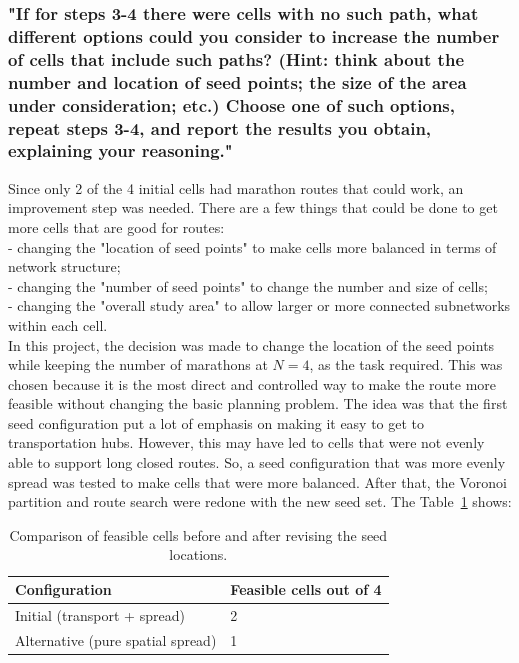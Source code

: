 \documentclass[acmsmall,nonacm,natbib=false]{acmart}
\begin{document}
\subsubsection{\large\textbf{{"If for steps 3-4 there were cells with no such path, what different options could you consider to increase the number of cells that include such paths? (Hint: think about the number and location of seed points; the size of the area under consideration; etc.) Choose one of such options, repeat steps 3-4, and report the results you obtain, explaining your reasoning."}}}
\leavevmode \par \noindent
Since only 2 of the 4 initial cells had marathon routes that could work, an improvement step was needed. There are a few things that could be done to get more cells that are good for routes:\\
- changing the "location of seed points" to make cells more balanced in terms of network structure;\\ - changing the "number of seed points" to change the number and size of cells;\\ - changing the "overall study area" to allow larger or more connected subnetworks within each cell.\\
In this project, the decision was made to change the location of the seed points while keeping the number of marathons at $N=4$, as the task required. This was chosen because it is the most direct and controlled way to make the route more feasible without changing the basic planning problem. The idea was that the first seed configuration put a lot of emphasis on making it easy to get to transportation hubs. However, this may have led to cells that were not evenly able to support long closed routes. So, a seed configuration that was more evenly spread was tested to make cells that were more balanced.
After that, the Voronoi partition and route search were redone with the new seed set. The Table~\ref{tab:taskC_comparison} shows:
\begin{table}
\centering
\vspace{-10pt}
\caption{Comparison of feasible cells before and after revising the seed locations.}
\label{tab:taskC_comparison}
\begin{tabular}{p{4.5cm} p{2cm}}
\toprule
\textbf{Configuration} & 
\textbf{Feasible cells out of 4} \\
\midrule
Initial (transport + spread) & 2 \\
Alternative (pure spatial spread) & 1 \\
\bottomrule
\end{tabular}
\vspace{-10pt}
\end{table}
\end{document}
